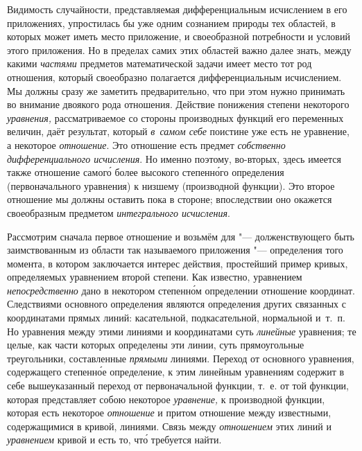 Видимость случайности, представляемая дифференциальным исчислением в его
приложениях, упростилась бы уже одним сознанием природы тех областей, в которых
может иметь место приложение, и своеобразной потребности и условий этого
приложения. Но в пределах самих этих областей важно далее знать, между какими
{\em частями} предметов математической задачи имеет место тот род отношения,
который своеобразно полагается дифференциальным исчислением. Мы должны сразу же
заметить предварительно, что при этом нужно принимать во внимание двоякого рода
отношения. Действие понижения степени некоторого {\em уравнения,}
рассматриваемое со стороны производных функций его переменных величин, даёт
результат, который {\em в~самом себе} поистине уже есть не уравнение,
а некоторое {\em отношение}. Это отношение есть предмет
{\em собственно дифференциального исчисления}. Но именно поэтому, во-вторых,
здесь имеется также отношение самог\'{о} более высокого степенн\'{о}го определения
(первоначального уравнения) к низшему (производной функции). Это второе
отношение мы должны оставить пока в стороне; впоследствии оно окажется
своеобразным предметом {\em интегрального исчисления}.

Рассмотрим сначала первое отношение и возьмём для "--- долженствующего быть
заимствованным из области так называемого приложения "--- определения того
момента, в котором заключается интерес действия, простейший пример кривых,
определяемых уравнением второй степени. Как известно, уравнением
{\em непосредственно} дано в некотором степенн\'{о}м определении отношение
координат. Следствиями основного определения являются определения других
связанных с координатами прямых линий: касательной, подкасательной, нормальной
и~т.~п. Но уравнения между этими линиями и координатами суть {\em линейные}
уравнения; те целые, как части которых определены эти линии, суть прямоугольные
треугольники, составленные {\em прямыми} линиями. Переход от основного
уравнения, содержащего степенн\'{о}е определение, к этим линейным уравнениям
содержит в себе вышеуказанный переход от первоначальной функции, т.~е. от той
функции, которая представляет собою некоторое {\em уравнение,} к производной
функции, которая есть некоторое {\em отношение} и притом отношение между
известными, содержащимися в кривой, линиями. Связь между {\em отношением} этих
линий и {\em уравнением} кривой и есть то, чт\'{о} требуется найти.

